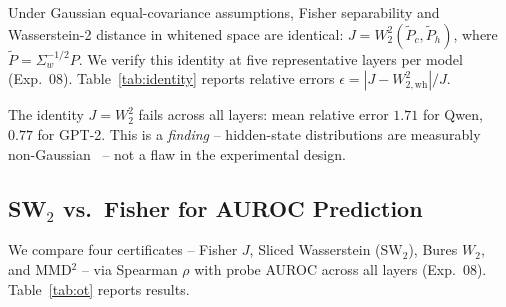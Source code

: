 \documentclass[10pt,twocolumn]{article}
\begin{document}
Under Gaussian equal-covariance assumptions, Fisher separability and
Wasserstein-2 distance in whitened space are identical:
$J = W_2^2\!\left(\tilde{P}_c, \tilde{P}_h\right)$, where $\tilde{P} =
\Sigma_w^{-1/2} P$.
We verify this identity at five representative layers per model
(Exp.~08). Table~\ref{tab:identity} reports relative errors
$\epsilon = |J - W_{2,\text{wh}}^2| / J$.

\begin{table}[!htbp]
\centering
\caption{Relative error of $J \approx W_2^2$ (whitened) identity at
  five layers per model (Exp.~08).  Identity never holds; error grows
  with depth for Qwen.}
\label{tab:identity}
\small
\setlength{\tabcolsep}{4pt}
\end{table}

The identity $J = W_2^2$ fails across all layers: mean relative error
$1.71$ for Qwen, $0.77$ for GPT-2. This is a \emph{finding} --
hidden-state distributions are measurably
non-Gaussian~\citep{disipio2025fisher} -- not a flaw in the
experimental design.

\subsection{\texorpdfstring{SW$_2$}{SW2} vs.\ Fisher for AUROC Prediction}
\label{sec:ot-sw2}

We compare four certificates -- Fisher $J$, Sliced Wasserstein
($\text{SW}_2$), Bures $W_2$, and MMD$^2$ -- via Spearman $\rho$ with
probe AUROC across all layers (Exp.~08). Table~\ref{tab:ot} reports results.

\begin{table}[!htbp]
\centering
\caption{Spearman $\rho$ between certificate value and probe AUROC across
  all layers (Exp.~08).  Higher is better.  Bures~$W_2$ and SW$_2$ both
  substantially outperform Fisher on Qwen (best: Bures 0.828, bold);
  Fisher wins on GPT-2.  SW$_2$ and Bures~$W_2$ are distribution-free;
  the 0.007 gap between them is within noise.}
\label{tab:ot}
\small
\setlength{\tabcolsep}{4pt}
\end{table}
\end{document}
